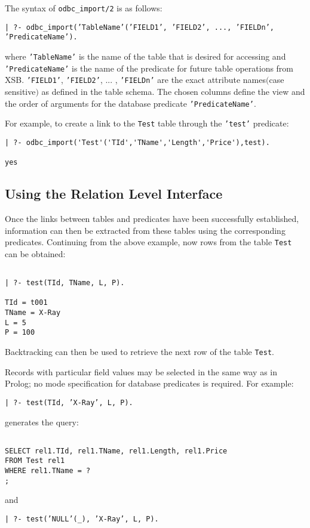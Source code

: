 The syntax of  {\tt odbc\_import/2} is as follows:

\begin{center}
{\tt | ?- odbc\_import('TableName'('FIELD1', 'FIELD2', ..., 'FIELDn', 'PredicateName').}
\end{center}

where {\tt 'TableName'} is the name of the table that is desired for accessing
and {\tt 'PredicateName'} is the name of the predicate for future table operations 
from XSB. {\tt 'FIELD1'}, {\tt 'FIELD2'}, ... , {\tt 'FIELDn'} are
the exact attribute names$($case sensitive$)$ as defined in the table schema.  The
chosen columns define the view and the order of arguments for the
database predicate {\tt 'PredicateName'}.  
 
For example, to create a link to the {\tt  Test} table through the {\tt 'test'} predicate:
\begin{verbatim}
| ?- odbc_import('Test'('TId','TName','Length','Price'),test).

yes
\end{verbatim}

\subsection{Using the Relation Level Interface}

Once the links between tables and predicates have been successfully established, 
information can then be extracted from these tables using the corresponding 
predicates.   Continuing from the above example, now rows from the table 
{\tt Test} can be obtained:
 \begin{verbatim}

| ?- test(TId, TName, L, P).

TId = t001
TName = X-Ray
L = 5
P = 100 
\end{verbatim}

Backtracking can then be used to retrieve the next row of the table {\tt Test}.

Records with particular field values may be selected in the same way
as in Prolog; no mode specification for database predicates is
required. For example:
\begin{center}

{\tt | ?- test(TId, 'X-Ray', L, P).}
\end{center}
generates the query:
\begin{verbatim}

SELECT rel1.TId, rel1.TName, rel1.Length, rel1.Price
FROM Test rel1
WHERE rel1.TName = ?
;
\end{verbatim}
and 
\begin{center}

{\tt | ?- test('NULL'(\_), 'X-Ray',  L, P).}
\end{center}

